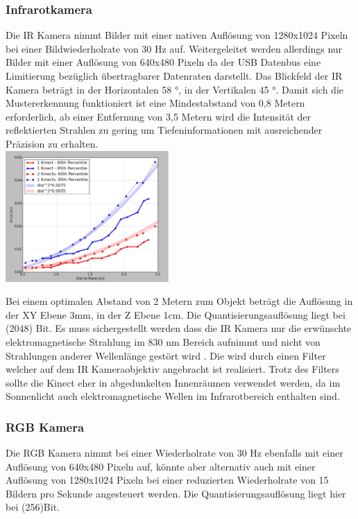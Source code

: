 \documentclass[
	12pt,
	a4paper,
	BCOR10mm,
	DIV14,
	listof=totoc,
	bibliography=totoc,
	headsepline
]{scrreprt}
\begin{document}
\subsubsection{Infrarotkamera}


Die IR Kamera nimmt Bilder mit einer nativen Auflösung von 1280x1024 Pixeln bei einer Bildwiederholrate von 30 Hz auf. Weitergeleitet werden allerdings nur Bilder mit einer Auflösung von 640x480 Pixeln da der USB Datenbus eine Limitierung bezüglich übertragbarer Datenraten darstellt. Das Blickfeld der IR Kamera beträgt in der Horizontalen 58 °, in der Vertikalen 45 °. Damit sich die Mustererkennung funktioniert ist eine Mindestabstand von 0,8 Metern erforderlich, ab einer Entfernung von 3,5 Metern wird die Intensität der reflektierten Strahlen zu gering um Tiefeninformationen mit ausreichender Präzision zu erhalten.\\

\includegraphics[height=5cm]{Res/Res_to_Dist.png}

Bei einem optimalen Abstand von 2 Metern zum Objekt beträgt die Auflösung in der XY Ebene 3mm, in der Z Ebene 1cm.
Die Quantisierungsauflösung liegt bei  (2048) Bit.
Es muss sichergestellt werden dass die IR Kamera nur die erwünschte elektromagnetische Strahlung im 830 nm Bereich aufnimmt und nicht von Strahlungen anderer Wellenlänge gestört wird . Die wird durch einen Filter welcher auf dem IR Kameraobjektiv angebracht ist realisiert.
Trotz des Filters sollte die Kinect eher in abgedunkelten Innenräumen verwendet werden, da im Sonnenlicht auch elektromagnetische Wellen im Infrarotbereich enthalten sind.\\

\subsubsection{RGB Kamera}

Die RGB Kamera nimmt bei einer Wiederholrate von 30 Hz ebenfalls mit einer Auflösung von 640x480 Pixeln auf, könnte aber alternativ auch mit einer Auflösung von 1280x1024 Pixeln bei einer reduzierten Wiederholrate von 15 Bildern pro Sekunde angesteuert werden.
Die Quantisierungsauflösung liegt hier bei  (256)Bit. \\
\end{document}
